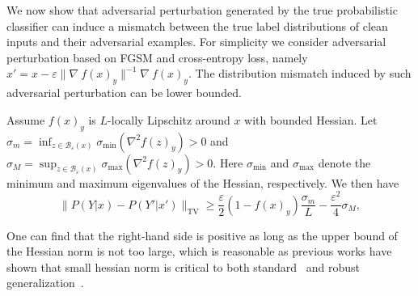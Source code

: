     We now show that adversarial perturbation generated by the true probabilistic classifier can induce a mismatch between the true label distributions of clean inputs and their adversarial examples.
    For simplicity we consider adversarial perturbation based on FGSM and cross-entropy loss, namely $x' = x -\varepsilon \|\nabla~f(x)_y\|^{-1} \nabla~f(x)_y$.
    The distribution mismatch induced by such adversarial perturbation can be lower bounded.
    \begin{lemma}
    \label{theorem:distribution-mismatch-true-model}
    Assume $f(x)_y$ is $L$-locally Lipschitz around $x$ with bounded Hessian. Let $\sigma_m = \inf_{z \in \mathcal{B}_\varepsilon(x)} \sigma_{\min} (\nabla^2 f(z)_y) > 0$ and $\sigma_M = \sup_{z \in \mathcal{B}_\varepsilon(x)} \sigma_{\max} (\nabla^2 f(z)_y) > 0$.
    Here $\sigma_{\min}$ and $\sigma_{\max}$ denote the minimum and maximum eigenvalues of the Hessian, respectively.
    We then have
    \begin{equation}
        \|P(Y|x) - P(Y'|x')\|_{\text{TV}} \ge
        \frac{\varepsilon}{2} (1 - f(x)_y) \frac{\sigma_m}{L}  - \frac{\varepsilon^2}{4} \sigma_M,
    \end{equation}
    \end{lemma}

    One can find that the right-hand side is positive as long as the upper bound of the Hessian norm is not too large, which is reasonable as previous works have shown that small hessian norm is critical to both standard~\citep{Keskar2017OnLT} and robust generalization~\citep{MoosaviDezfooli2019RobustnessVC}.


